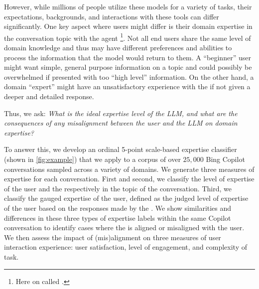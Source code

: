 However, while millions of people utilize these models for a variety of tasks, their expectations, backgrounds, and interactions with these tools can differ significantly. One key aspect where users might differ is their domain expertise in the conversation topic with the agent \footnote{Here on called .}. Not all end users share the same level of domain knowledge and thus may have different preferences and abilities to process the information that the model would return to them. A ``beginner'' user might want simple, general purpose information on a topic and could possibly be overwhelmed if presented with too ``high level'' information. On the other hand, a domain ``expert'' might have an unsatisfactory experience with the  if not given a deeper and detailed response.%

Thus, we ask: \textit{What is the ideal expertise level of the LLM, and what are the consequences of any misalignment between the user and the LLM on domain expertise?}

To answer this, we develop an ordinal 5-point scale-based expertise classifier (shown in \autoref{fig:example}) that we apply to a corpus of over $25,000$ Bing Copilot conversations sampled across a variety of domains. We generate three measures of expertise for each conversation. First and second, we classify the level of expertise of the user and the  respectively in the topic of the conversation. Third, we classify the gauged expertise of the user, defined as the judged level of expertise of the user based on the responses made by the . We show similarities and differences in these three types of expertise labels within the same Copilot conversation to identify cases where the  is aligned or misaligned with the user. We then assess the impact of (mis)alignment on three measures of user interaction experience: user satisfaction, level of engagement, and complexity of task.


